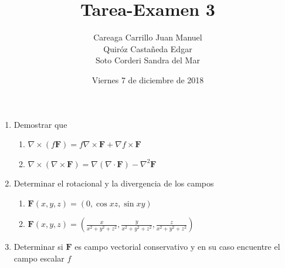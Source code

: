 \documentclass{article}
\begin{document}
    \title{Tarea-Examen 3}
    \author{Careaga Carrillo Juan Manuel\\
            Quiróz Castañeda Edgar\\
            Soto Corderi Sandra del Mar}
    \date{Viernes 7 de diciembre de 2018}
    \maketitle
    \begin{enumerate}

        \item {
            Demostrar que

            \begin{enumerate}
            \item{
				$\nabla \times (f \mathbf{F}) = f \nabla \times \mathbf{F} + \nabla f \times \mathbf{F}$

			\color{azul}


            }

            \item{
            	$\nabla \times (\nabla \times \mathbf{F}) = \nabla (\nabla \cdot \mathbf{F}) - \nabla^2 \mathbf{F}$

           \color{azul}

            }
            \end{enumerate}
	    }

        \item {
            Determinar el rotacional y la divergencia de los campos

            \begin{enumerate}
            \item{
				$\mathbf{F} (x,y,z) = (0,\cos xz,\sin xy)$

			\color{azul}
            }

            \item{
            	$\mathbf{F} (x,y,z) = (\frac{x}{x^2 + y^2 + z^2}, \frac{y}{x^2 + y^2 + z^2}, \frac{z}{x^2 + y^2 + z^2})$

           \color{azul}

            }
            \end{enumerate}
        }

        \item {
            Determinar si $\mathbf{F}$ es campo vectorial conservativo y en su caso encuentre el campo escalar $f$

}
\end{enumerate}
\end{document}
